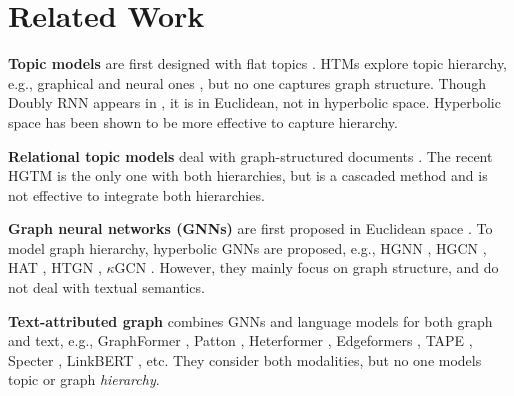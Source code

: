 \section{Related Work}

\textbf{Topic models} are first designed with flat topics \cite{lda,nvdm,prodlda,bertopic,topicgpt,nguyen2024topic,wu2019short,wu2020learning,wu2020short,wu2021discovering,wu2022mitigating,wu2023infoctm,wu2024dynamic,wu2024thesis}. HTMs explore topic hierarchy, e.g., graphical \cite{ncrp,dhtg,wedtm,dirbn,pam,dpfa,gbn,hdp} and neural ones \cite{tsntm,htv,hntm,sawetm,traco,hyhtm}, but no one captures graph structure. Though Doubly RNN appears in \cite{drnn,tsntm,htv}, it is in Euclidean, not in hyperbolic space. Hyperbolic space has been shown to be more effective to capture hierarchy.

\textbf{Relational topic models} deal with graph-structured documents \cite{rtm,nrtm,adjacent_encoder,gtnn,lantm}. %
The recent HGTM \cite{hgtm} is the only one with both hierarchies, but is a cascaded method and is not effective to integrate both hierarchies. %

\textbf{Graph neural networks (GNNs)} are first proposed in Euclidean space \cite{gcn,gat,graphsage}. To model graph hierarchy, hyperbolic GNNs are proposed, e.g., HGNN \cite{hgnn}, HGCN \cite{hgcn}, HAT \cite{hat}, HTGN \cite{htgn}, $\kappa$GCN \cite{kgcn}. However, they mainly focus on graph structure, and do not deal with textual semantics.

\textbf{Text-attributed graph} combines GNNs and language models for both graph and text, e.g., GraphFormer \cite{graphformers}, Patton \cite{patton}, Heterformer \cite{heterformer}, Edgeformers \cite{edgeformers}, TAPE \cite{tape}, Specter \cite{specter}, LinkBERT \cite{linkbert}, etc. They consider both modalities, but no one models topic or graph \emph{hierarchy}.